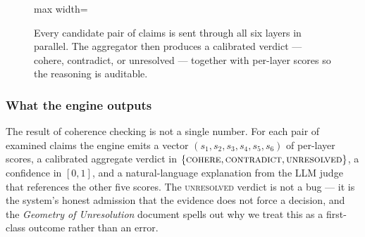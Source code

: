 \documentclass[11pt]{article}
\begin{document}
\begin{figure}[H]
\centering
\begin{adjustbox}{max width=\textwidth}
\end{adjustbox}
\caption{Every candidate pair of claims is sent through all six layers in parallel. The aggregator then produces a calibrated verdict --- cohere, contradict, or unresolved --- together with per-layer scores so the reasoning is auditable.}
\end{figure}

\subsubsection{What the engine outputs}

The result of coherence checking is not a single number. For each pair of examined claims the engine emits a vector $(s_1, s_2, s_3, s_4, s_5, s_6)$ of per-layer scores, a calibrated aggregate verdict in $\{\textsc{cohere}, \textsc{contradict}, \textsc{unresolved}\}$, a confidence in $[0,1]$, and a natural-language explanation from the LLM judge that references the other five scores. The \textsc{unresolved} verdict is not a bug --- it is the system's honest admission that the evidence does not force a decision, and the \emph{Geometry of Unresolution} document spells out why we treat this as a first-class outcome rather than an error.
\end{document}
